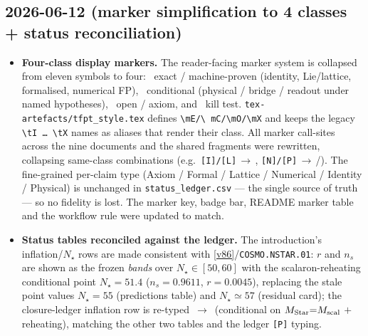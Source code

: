 \subsection*{2026-06-12 (marker simplification to 4 classes + status reconciliation)}
\begin{itemize}
\item \textbf{Four-class display markers.} The reader-facing marker system is collapsed from eleven
  symbols to four: \mE\ exact / machine-proven (identity, Lie/lattice, formalised, numerical FP),
  \mC\ conditional (physical / bridge / readout under named hypotheses), \mO\ open / axiom, and \mX\
  kill test. \texttt{tex-artefacts/tfpt\_style.tex} defines \texttt{\textbackslash mE/\textbackslash
  mC/\textbackslash mO/\textbackslash mX} and keeps the legacy \texttt{\textbackslash tI \ldots
  \textbackslash tX} names as aliases that render their class. All marker call-sites across the nine
  documents and the shared fragments were rewritten, collapsing same-class combinations (e.g.\
  \texttt{[I]/[L]}\,$\to$\,\mE, \texttt{[N]/[P]}\,$\to$\,\mE/\mC). The fine-grained per-claim type
  (Axiom / Formal / Lattice / Numerical / Identity / Physical) is unchanged in
  \texttt{status\_ledger.csv} --- the single source of truth --- so no fidelity is lost. The marker key,
  badge bar, README marker table and the workflow rule were updated to match.
\item \textbf{Status tables reconciled against the ledger.} The introduction's inflation/$N_\star$ rows
  are made consistent with \vref{v86}/\texttt{COSMO.NSTAR.01}: $r$ and $n_s$ are shown as the frozen
  \emph{bands} over $N_\star\in[50,60]$ with the scalaron-reheating conditional point $N_\star{=}51.4$
  ($n_s{=}0.9611$, $r{=}0.0045$), replacing the stale point values $N_\star{=}55$ (predictions table)
  and $N_\star\simeq57$ (residual card); the closure-ledger inflation row is re-typed \mE\,$\to$\,\mC
  (conditional on $M_{\rm Star}{=}M_{\rm scal}$ $+$ reheating), matching the other two tables and the
  ledger \texttt{[P]} typing.
\end{itemize}

